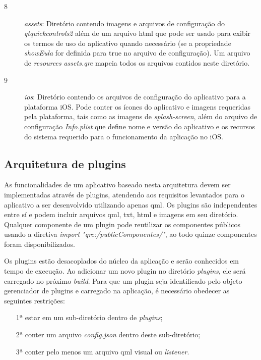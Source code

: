 \begin{description}
	\item[8] \textit{assets}: Diretório contendo imagens e arquivos de configuração do \textit{qtquickcontrols2} além de um arquivo html que pode ser usado para exibir os termos de uso do aplicativo quando necessário (se a propriedade \textit{showEula} for definida para true no arquivo de configuração). Um arquivo de \textit{resources} \textit{assets.qrc} mapeia todos os arquivos contidos neste diretório.

	\item[9] \textit{ios}: Diretório contendo os arquivos de configuração do aplicativo para a plataforma iOS. Pode conter os ícones do aplicativo e imagens requeridas pela plataforma, tais como as imagens de \textit{splash-screen}, além do arquivo de configuração \textit{Info.plist} que define nome e versão do aplicativo e os recursos do sistema requerido para o funcionamento da aplicação no iOS.
\end{description}


\subsection{Arquitetura de plugins}
As funcionalidades de um aplicativo baseado nesta arquitetura devem ser implementadas através de plugins, atendendo aos requisitos levantados para o aplicativo a ser desenvolvido utilizando apenas qml. Os plugins são independentes entre sí e podem incluir arquivos qml, txt, html e imagens em seu diretório. Qualquer componente de um plugin pode reutilizar os componentes públicos usando a diretiva \textit{import "qrc:/publicComponentes/"}, ao todo quinze componentes foram disponibilizados.\par
Os plugins estão desacoplados do núcleo da aplicação e serão conhecidos em tempo de execução. Ao adicionar um novo plugin no diretório \textit{plugins}, ele será carregado no próximo \textit{build}. Para que um plugin seja identificado pelo objeto gerenciador de plugins e carregado na aplicação, é necessário obedecer as seguintes restrições:

\begin{enumerate}
	\item[1ª] estar em um sub-diretório dentro de \textit{plugins};
	\item[2ª] conter um arquivo \textit{config.json} dentro deste sub-diretório;
	\item[3ª] conter pelo menos um arquivo qml visual ou \textit{listener}.
\end{enumerate}

